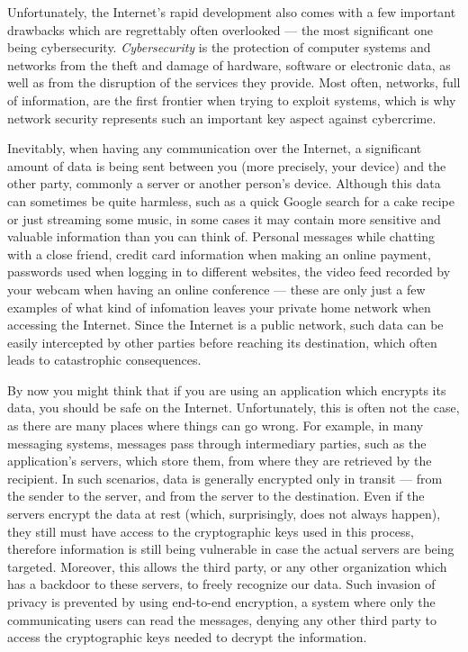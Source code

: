 \documentclass[a4paper,12pt]{report}
\begin{document}
		Unfortunately, the Internet's rapid development also comes with a few important drawbacks which are regrettably often overlooked --- the most significant one being cybersecurity. \textit{Cybersecurity} is the protection of computer systems and networks from the theft and damage of hardware, software or electronic data, as well as from the disruption of the services they provide. Most often, networks, full of information, are the first frontier when trying to exploit systems,  which is why network security represents such an important key aspect against cybercrime.
		
		Inevitably, when having any communication over the Internet, a significant amount of data is being sent between you (more precisely, your device) and the other party, commonly a server or another person's device. Although this data can sometimes be quite harmless, such as a quick Google search for a cake recipe or just streaming some music, in some cases it may contain more sensitive and valuable information than you can think of. Personal messages while chatting with a close friend, credit card information when making an online payment, passwords used when logging in to different websites, the video feed recorded by your webcam when having an online conference --- these are only just a few examples of what kind of infomation leaves your private home network when accessing the Internet. Since the Internet is a public network, such data can be easily intercepted by other parties before reaching its destination, which often leads to catastrophic consequences.
		
		By now you might think that if you are using an application which encrypts its data, you should be safe on the Internet. Unfortunately, this is often not the case, as there are many places where things can go wrong. For example, in many messaging systems, messages pass through intermediary parties, such as the application's servers, which store them, from where they are retrieved by the recipient. In such scenarios, data is generally encrypted only in transit --- from the sender to the server, and from the server to the destination. Even if the servers encrypt the data at rest (which, surprisingly, does not always happen), they still must have access to the cryptographic keys used in this process, therefore information is still being vulnerable in case the actual servers are being targeted. Moreover, this allows the third party, or any other organization which has a backdoor to these servers, to freely recognize our data. Such invasion of privacy is prevented by using end-to-end encryption, a system where only the communicating users can read the messages, denying any other third party to access the cryptographic keys needed to decrypt the information.
		
\end{document}
